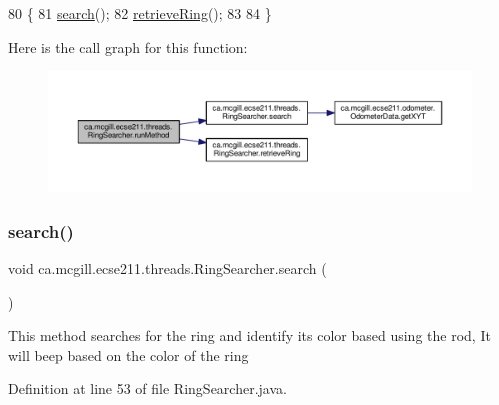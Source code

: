 \begin{DoxyCode}
80                              \{
81     \hyperlink{classca_1_1mcgill_1_1ecse211_1_1threads_1_1_ring_searcher_abd2b2c172ea393ce4185027c8a12780f}{search}();
82     \hyperlink{classca_1_1mcgill_1_1ecse211_1_1threads_1_1_ring_searcher_abd7a2651a7c5de76a018664c8bf327af}{retrieveRing}();
83 
84   \}
\end{DoxyCode}
Here is the call graph for this function\+:
\nopagebreak
\begin{figure}[H]
\begin{center}
\leavevmode
\includegraphics[width=350pt]{classca_1_1mcgill_1_1ecse211_1_1threads_1_1_ring_searcher_a2b03c700b5d232f5aef7c6acf439b7ea_cgraph}
\end{center}
\end{figure}
\mbox{\label{classca_1_1mcgill_1_1ecse211_1_1threads_1_1_ring_searcher_abd2b2c172ea393ce4185027c8a12780f}} 
\subsubsection{\texorpdfstring{search()}{search()}}
{\footnotesize\ttfamily void ca.\+mcgill.\+ecse211.\+threads.\+Ring\+Searcher.\+search (\begin{DoxyParamCaption}{ }\end{DoxyParamCaption})}

This method searches for the ring and identify its color based using the rod, It will beep based on the color of the ring 

Definition at line 53 of file Ring\+Searcher.\+java.



